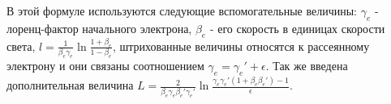 В этой формуле используются следующие вспомогательные величины: $\gamma_e$ - лоренц-фактор начального электрона, $\beta_e$ - его скорость в единицах скорости света, $l = \frac{1}{\beta_e\gamma_e}\ln\frac{1+\beta_e}{1-\beta_e}$, штрихованные величины относятся к рассеянному электрону и они связаны соотношением $\gamma_e = \gamma_e' + \epsilon$. Так же введена дополнительная величина $L = \frac{2}{\beta_e\gamma_e\beta_e'\gamma_e'}\ln\frac{\gamma_e\gamma_e'\left(1+\beta_e\beta_e'\right)-1}{\epsilon}$.